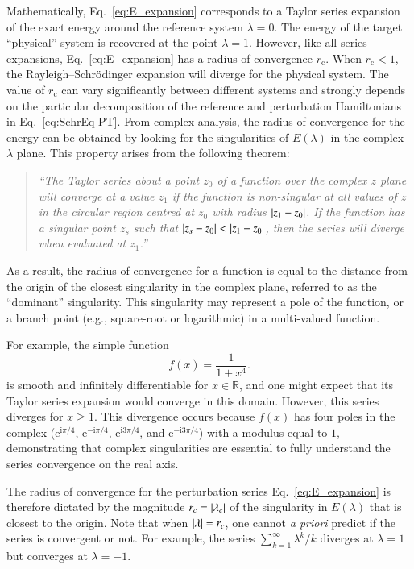 \documentclass[aps,prb,reprint,noshowkeys,superscriptaddress]{revtex4-1}
\newcommand{\latin}[1]{#1}
\newcommand{\eg}{\latin{e.g.}}
\renewcommand{\i}{\mathrm{i}} %
\newcommand{\e}{\mathrm{e}} %
\newcommand{\rc}{r_{\text{c}}}
\begin{document}
Mathematically, Eq.~\eqref{eq:E_expansion} corresponds to a Taylor series expansion of the exact energy
around the reference system $\lambda = 0$.
The energy of the target ``physical'' system is recovered at the point $\lambda = 1$.
However, like all series expansions, Eq.~\eqref{eq:E_expansion} has a radius of convergence $\rc$. 
When $\rc < 1$, the Rayleigh--Schr\"{o}dinger expansion will diverge
for the physical system.
The value of $\rc$ can vary significantly between different systems and strongly depends on the particular decomposition
of the reference and perturbation Hamiltonians in Eq.~\eqref{eq:SchrEq-PT}.\cite{Mihalka_2017b}
%
From complex-analysis, \cite{BenderBook} the radius of convergence for the energy can be obtained by looking for the 
singularities of $E(\lambda)$ in the complex $\lambda$ plane.
This property arises from the following theorem: \cite{Goodson_2011}
\begin{quote}
\it
``The Taylor series about a point $z_0$ of a function over the complex $z$ plane will converge at a value $z_1$ 
if the function is non-singular at all values of $z$ in the circular region centred at $z_0$ with radius $\abs{z_1-z_0}$. 
If the function has a singular point $z_s$ such that $\abs{z_s-z_0} < \abs{z_1-z_0}$, 
then the series will diverge when evaluated at $z_1$.''
\end{quote}
As a result, the radius of convergence for a function is equal to the distance from the origin of the closest singularity
in the complex plane, referred to as the ``dominant'' singularity.
This singularity may represent a pole of the function, or a branch point (\eg, square-root or logarithmic)
in a multi-valued function.

For example, the simple function
\begin{equation} \label{eq:DivExample}
	f(x)=\frac{1}{1+x^4}.
\end{equation}
is smooth and infinitely differentiable for $x \in \mathbb{R}$, and one might expect that its Taylor series expansion would 
converge in this domain.
However, this series diverges for $x \ge 1$.
This divergence occurs because $f(x)$ has four poles in the complex 
($\e^{\i\pi/4}$, $\e^{-\i\pi/4}$, $\e^{\i3\pi/4}$, and $\e^{-\i3\pi/4}$) with a modulus equal to $1$, demonstrating
that complex singularities are essential to fully understand the series convergence on the real axis.\cite{BenderBook}

The radius of convergence for the perturbation series Eq.~\eqref{eq:E_expansion} is therefore dictated by the magnitude $r_c = \abs{\lambda_c}$ of the
singularity in $E(\lambda)$ that is closest to the origin.
Note that when $\abs{\lambda} = r_c$, one cannot \textit{a priori} predict if the series is convergent or not.
For example, the series $\sum_{k=1}^\infty \lambda^k/k$ diverges at $\lambda = 1$ but converges at $\lambda = -1$.
\end{document}
